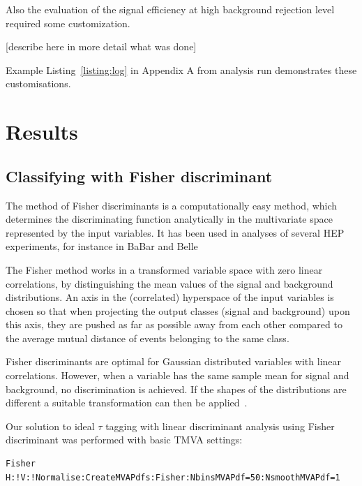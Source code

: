 \documentclass[a4paper]{jpconf}
\begin{document}
Also the evaluation of the signal efficiency at high background rejection
level required some customization.

[describe here in more detail what was done]

Example Listing~\ref{listing:log} in Appendix A from analysis run demonstrates these customisations.


\section{Results}\label{sec:results}

\subsection{Classifying with Fisher discriminant}
The method of Fisher discriminants is a computationally easy method,
which determines the discriminating function analytically in the
multivariate space represented by the input variables.  It has been
used in analyses of several HEP experiments, for instance in BaBar \cite{fisherbabar} and
Belle \cite{fisherbelle}

The Fisher method works in a transformed variable space with zero
linear correlations, by distinguishing the mean values of the signal
and background distributions. An axis in the (correlated) hyperspace
of the input variables is chosen so that when projecting the output
classes (signal and background) upon this axis, they are pushed as far
as possible away from each other compared to the average mutual
distance of events belonging to the same class\cite{tmvasite}.

Fisher discriminants are optimal for Gaussian distributed variables
with linear correlations. However, when a variable has the same sample
mean for signal and background, no discrimination is achieved. If the
shapes of the distributions are different a suitable transformation
can then be applied~\cite{tmvasite}.


Our solution to ideal $\tau$ tagging with linear discriminant analysis  using Fisher discriminant
was performed with basic TMVA settings:

\begin{verbatim}
Fisher H:!V:!Normalise:CreateMVAPdfs:Fisher:NbinsMVAPdf=50:NsmoothMVAPdf=1
\end{verbatim}
\end{document}
